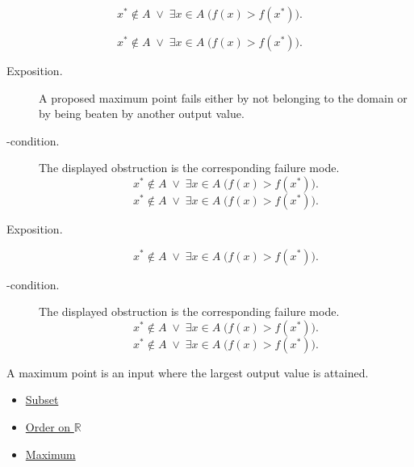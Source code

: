 \begin{remark*}
\[
  x^*\notin A\;\vee\;\exists x\in A\;\bigl(f(x)>f(x^*)\bigr).
\]
\end{remark*}

\begin{remark*}
\[
  x^*\notin A\;\vee\;\exists x\in A\;\bigl(f(x)>f(x^*)\bigr).
\]
\end{remark*}



\begin{remark*}
\begin{description}
  \item[Exposition.]
A proposed maximum point fails either by not belonging to the domain or by
being beaten by another output value.


  \item[\exists-condition.]
  The displayed obstruction is the corresponding failure mode.
  \[
  x^*\notin A\;\vee\;\exists x\in A\;\bigl(f(x)>f(x^*)\bigr).
\]
  \[
  x^*\notin A\;\vee\;\exists x\in A\;\bigl(f(x)>f(x^*)\bigr).
\]
\end{description}
\end{remark*}

\begin{remark*}
\begin{description}
  \item[Exposition.]
\[
  x^*\notin A
  \;\vee\;
  \exists x\in A\;\bigl(f(x)>f(x^*)\bigr).
\]


  \item[\exists-condition.]
  The displayed obstruction is the corresponding failure mode.
  \[
  x^*\notin A\;\vee\;\exists x\in A\;\bigl(f(x)>f(x^*)\bigr).
\]
  \[
  x^*\notin A\;\vee\;\exists x\in A\;\bigl(f(x)>f(x^*)\bigr).
\]
\end{description}
\end{remark*}

\begin{remark*}[Interpretation]
A maximum point is an input where the largest output value is attained.
\end{remark*}

\begin{dependencies}
\begin{itemize}
  \item \hyperref[def:subset]{Subset}
  \item \hyperref[def:order-on-r]{Order on $\mathbb{R}$}
  \item \hyperref[def:maximum]{Maximum}
\end{itemize}
\end{dependencies}


